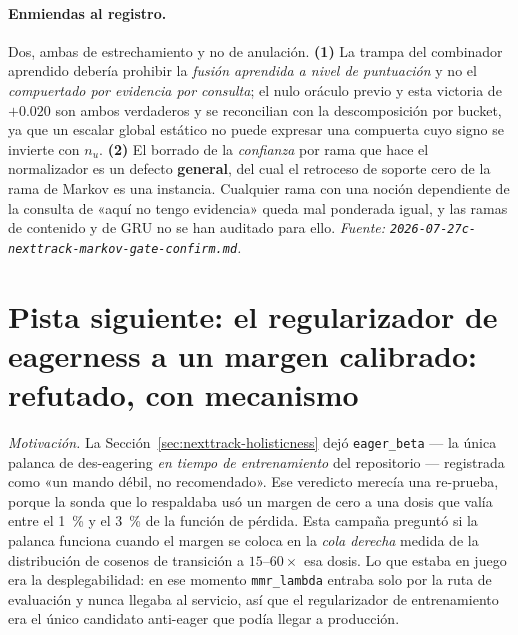 \documentclass[11pt]{article}
\begin{document}
\paragraph{Enmiendas al registro.} Dos, ambas de estrechamiento y no de
anulación. \textbf{(1)} La trampa del combinador aprendido debería prohibir la
\emph{fusión aprendida a nivel de puntuación} y no el \emph{compuertado por
evidencia por consulta}; el nulo oráculo previo y esta victoria de
$+\num{0.020}$ son ambos verdaderos y se reconcilian con la descomposición por
bucket, ya que un escalar global estático no puede expresar una compuerta cuyo
signo se invierte con $n_u$. \textbf{(2)} El borrado de la \emph{confianza} por
rama que hace el normalizador es un defecto \textbf{general}, del cual el retroceso
de soporte cero de la rama de Markov es una instancia. Cualquier rama con una
noción dependiente de la consulta de «aquí no tengo evidencia» queda mal ponderada
igual, y las ramas de contenido y de GRU no se han auditado para ello.
\emph{Fuente: \texttt{2026-07-27c-nexttrack-markov-gate-confirm.md}.}

\section{Pista siguiente: el regularizador de eagerness a un margen calibrado: refutado, con mecanismo}
\label{sec:nexttrack-eagermargin}
\emph{Motivación.} La Sección~\ref{sec:nexttrack-holisticness} dejó \texttt{eager\_beta}
--- la única palanca de des-eagering \emph{en tiempo de entrenamiento} del
repositorio --- registrada como «un mando débil, no recomendado». Ese veredicto
merecía una re-prueba, porque la sonda que lo respaldaba usó un margen de cero a una
dosis que valía entre el \SI{1}{\percent} y el \SI{3}{\percent} de la función de
pérdida. Esta campaña preguntó si la palanca funciona cuando el margen se coloca en
la \emph{cola derecha} medida de la distribución de cosenos de transición a
$\numrange{15}{60}\times$ esa dosis. Lo que estaba en juego era la
desplegabilidad: en ese momento \texttt{mmr\_lambda} entraba solo por la ruta de
evaluación y nunca llegaba al servicio, así que el regularizador de entrenamiento
era el único candidato anti-eager que podía llegar a producción.
\end{document}

